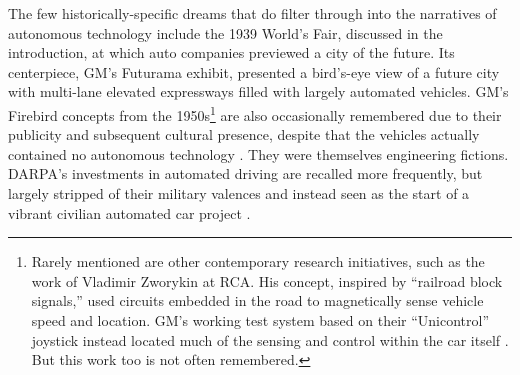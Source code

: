 The few historically-specific 
dreams that do filter through into the narratives of autonomous
technology \cite{CBSPetersen} 
include the 1939 World's Fair, discussed
in the introduction, at which auto companies
previewed a city of the future. Its centerpiece, GM's Futurama
exhibit, presented a bird's-eye view of a future city with multi-lane elevated
expressways filled with largely automated vehicles. GM's Firebird concepts
from the 1950s\footnote{Rarely mentioned are other contemporary research
  initiatives, such as the work of
  Vladimir Zworykin at RCA. His 
  concept, inspired by ``railroad block signals,'' used circuits
  embedded in the road to magnetically sense vehicle speed and
  location. GM's working test system based on their ``Unicontrol''
  joystick instead located much of the sensing and control within the car
itself \cite[p. 8]{wetmore}. But this work too is not often
remembered.} are also occasionally remembered due to their publicity
and 
subsequent cultural presence, \cite{walshVs} despite that the vehicles actually
contained no autonomous technology \cite[p. 7]{wetmore}. They were
themselves engineering fictions. DARPA's investments in automated
driving are recalled more frequently, but largely stripped of their
military valences and instead seen as the start of a vibrant civilian
automated car project \cite{economistSR}.

